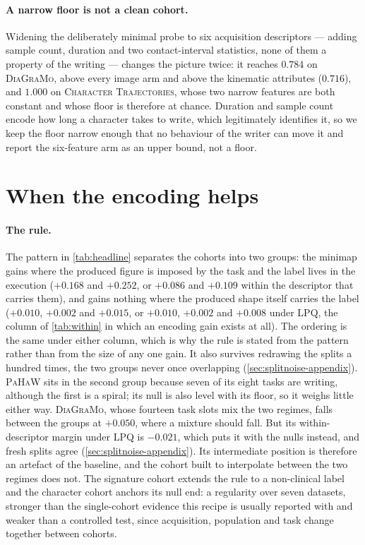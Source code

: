 \documentclass{article}
\begin{document}
\paragraph{A narrow floor is not a clean cohort.} Widening the deliberately minimal probe to six
acquisition descriptors --- adding sample count, duration and two contact-interval statistics, none
of them a property of the writing --- changes the picture twice: it reaches $0.784$ on
\textsc{DiaGraMo}, above every image arm and above the kinematic attributes ($0.716$), and $1.000$
on \textsc{Character Trajectories}, whose two narrow features are both constant and whose floor is
therefore at chance. Duration and sample count encode how long a character takes to write, which
legitimately identifies it, so we keep the floor narrow enough that no behaviour of the writer can
move it and report the six-feature arm as an upper bound, not a floor.

\section{When the encoding helps}
\label{sec:when}

\paragraph{The rule.} The pattern in \cref{tab:headline} separates the cohorts into two groups: the
minimap gains where the produced figure is imposed by the task and the label lives in the execution
($+0.168$ and $+0.252$, or $+0.086$ and $+0.109$ within the descriptor that carries them), and gains
nothing where the produced shape itself carries the label ($+0.010$, $+0.002$ and $+0.015$, or
$+0.010$, $+0.002$ and $+0.008$ under LPQ, the column of \cref{tab:within} in which an encoding gain
exists at all). The ordering is the same under either column, which is why the rule is stated from
the pattern rather than from the size of any one gain. It also survives redrawing the splits a
hundred times, the two groups never once overlapping (\cref{sec:splitnoise-appendix}).
\textsc{PaHaW} sits in the second group because seven of its eight
tasks are writing, although the first is a spiral; its null is also level with its floor, so it
weighs little either way. \textsc{DiaGraMo}, whose fourteen task slots mix the two regimes, falls
between the groups at $+0.050$, where a mixture should fall. But its within-descriptor margin
under LPQ is $-0.021$, which puts it with the nulls instead, and fresh splits agree
(\cref{sec:splitnoise-appendix}). Its intermediate position is therefore an artefact of the
baseline, and the cohort built to interpolate between the two regimes does not. The signature cohort
extends the rule to a non-clinical label and the character cohort anchors its null end: a regularity
over seven datasets, stronger than the single-cohort evidence this recipe is usually reported with
and weaker than a controlled test, since acquisition, population and task change together between
cohorts.
\end{document}
